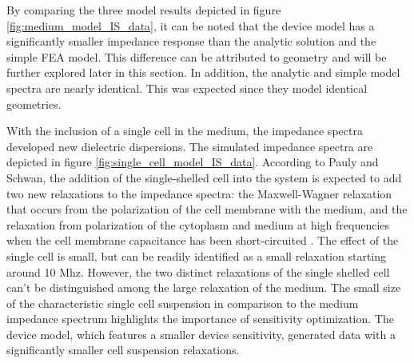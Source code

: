 \par By comparing the three model results depicted in figure \ref{fig:medium_model_IS_data}, it can be noted that the device model has a significantly smaller impedance response than the analytic solution and the simple FEA model. This difference can be attributed to geometry and will be further explored later in this section. In addition, the analytic and simple model spectra are nearly identical. This was expected since they model identical geometries.


\par With the inclusion of a single cell in the medium, the impedance spectra developed new dielectric dispersions. The simulated impedance spectra are depicted in figure \ref{fig:single_cell_model_IS_data}. According to Pauly and Schwan, the addition of the single-shelled cell into the system is expected to add two new relaxations to the impedance spectra: the Maxwell-Wagner relaxation that occurs from the polarization of the cell membrane with the medium, and the relaxation from polarization of the cytoplasm and medium at high frequencies when the cell membrane capacitance has been short-circuited \cite{pauly_uber_1959,sun_single-cell_2010}. The effect of the single cell is small, but can be readily identified as a small relaxation starting around 10 Mhz. However, the two distinct relaxations of the single shelled cell can't be distinguished among the large relaxation of the medium. The small size of the characteristic single cell suspension in comparison to the medium impedance spectrum highlights the importance of sensitivity optimization. The device model, which features a smaller device sensitivity, generated data with a significantly smaller cell suspension relaxations. 

